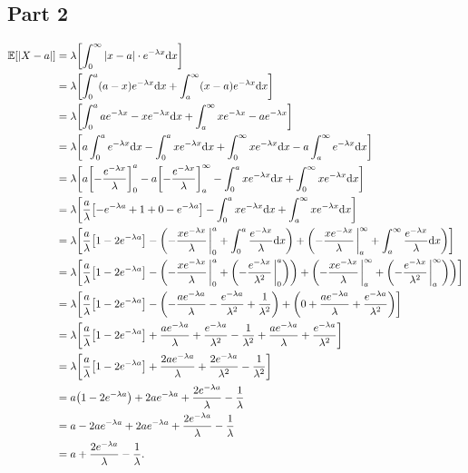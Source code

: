 \documentclass[12pt]{extarticle}
\begin{document}
\subsection*{Part 2}
\begin{align*}
	\Exp{|X - a|} &= \lambda \qty[\int_0^\infty |x - a| \cdot e^{-\lambda x} \dd x ]\\
				  &= \lambda \qty[\int_0^a (a-x) e^{-\lambda x} \dd x + \int_a^\infty (x - a) e^{-\lambda x} \dd x ]\\
				  &= \lambda \qty[\int_0^a ae^{-\lambda x} - xe^{-\lambda x} \dd x + \int_a^\infty xe^{-\lambda x} - ae^{-\lambda x}  ]\\
				  &= \lambda \qty[a\int_0^a e^{-\lambda x} \dd x - \int_0^a xe^{-\lambda x} \dd x + \int_0^\infty xe^{-\lambda x} \dd x - a \int_a^\infty e^{-\lambda x} \dd x ]\\
				  &= \lambda \qty[a \qty[-\frac{e^{-\lambda x}}{\lambda}]_0^a - a \qty[-\frac{e^{-\lambda x}}{\lambda}]_a^\infty - \int_0^a xe^{-\lambda x} \dd x + \int_0^\infty xe^{-\lambda x} \dd x ]\\
				  &= \lambda \qty[\frac{a}{\lambda} \qty[-e^{-\lambda a} + 1 + 0 - e^{-\lambda a}] - \int_0^a xe^{-\lambda x} \dd x + \int_a^\infty xe^{-\lambda x} \dd x ]\\
				  &= \lambda \qty[\frac{a}{\lambda} \qty[1-2e^{-\lambda a}] - \qty(-\frac{xe^{-\lambda x}}{\lambda} \eval_0^a + \int_0^a \frac{e^{-\lambda x}}{\lambda} \dd x) + \qty(-\frac{xe^{-\lambda x}}{\lambda} \eval_a^\infty + \int_a^\infty \frac{e^{-\lambda x}}{\lambda} \dd x) ]\\
				  &= \lambda \qty[\frac{a}{\lambda} \qty[1-2e^{-\lambda a}] - \qty(-\frac{xe^{-\lambda x}}{\lambda} \eval_0^a + \qty(-\frac{e^{-\lambda x}}{\lambda^2} \eval_0^a)) + \qty(-\frac{xe^{-\lambda x}}{\lambda} \eval_a^\infty + \qty(-\frac{e^{-\lambda x}}{\lambda^2} \eval_a^\infty)) ]\\
				  &= \lambda \qty[\frac{a}{\lambda} \qty[1-2e^{-\lambda a}] - \qty(-\frac{ae^{-\lambda a}}{\lambda} - \frac{e^{-\lambda a}}{\lambda^2} + \frac{1}{\lambda^2}) + \qty(0 + \frac{ae^{-\lambda a}}{\lambda} + \frac{e^{-\lambda a}}{\lambda^2} ) ] \\
				  &= \lambda \qty[\frac{a}{\lambda} \qty[1-2e^{-\lambda a}] + \frac{ae^{-\lambda a}}{\lambda} + \frac{e^{-\lambda a}}{\lambda^2} - \frac{1}{\lambda^2} + \frac{ae^{-\lambda a}}{\lambda} + \frac{e^{-\lambda a}}{\lambda^2} ] \\
				  &= \lambda \qty[\frac{a}{\lambda} \qty[1-2e^{-\lambda a}] + \frac{2ae^{-\lambda a}}{\lambda} + \frac{2e^{-\lambda a}}{\lambda^2} - \frac{1}{\lambda^2} ] \\
				  &= a\qty(1-2e^{-\lambda a}) + 2ae^{-\lambda a} + \frac{2e^{-\lambda a}}{\lambda} - \frac{1}{\lambda} \\
				  &= a-2ae^{-\lambda a} + 2ae^{-\lambda a} + \frac{2e^{-\lambda a}}{\lambda} - \frac{1}{\lambda} \\
				  &= a + \frac{2e^{-\lambda a}}{\lambda} - \frac{1}{\lambda}
.\end{align*}
\end{document}
